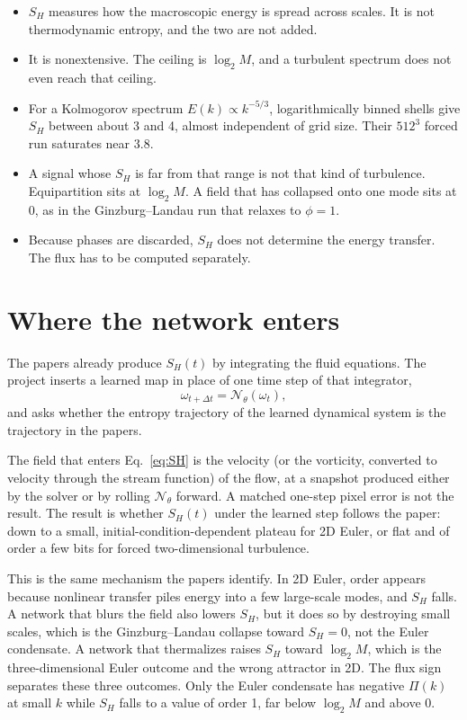 \documentclass[11pt,a4paper]{article}
\begin{document}
\begin{itemize}
  \item \(S_H\) measures how the macroscopic energy is spread across scales. It is not thermodynamic entropy, and the two are not added.
  \item It is nonextensive. The ceiling is \(\log_2 M\), and a turbulent spectrum does not even reach that ceiling.
  \item For a Kolmogorov spectrum \(E(k)\propto k^{-5/3}\), logarithmically binned shells give \(S_H\) between about 3 and 4, almost independent of grid size. Their \(512^3\) forced run saturates near \(3.8\).
  \item A signal whose \(S_H\) is far from that range is not that kind of turbulence. Equipartition sits at \(\log_2 M\). A field that has collapsed onto one mode sits at \(0\), as in the Ginzburg--Landau run that relaxes to \(\phi = 1\).
  \item Because phases are discarded, \(S_H\) does not determine the energy transfer. The flux has to be computed separately.
\end{itemize}

\section{Where the network enters}

The papers already produce \(S_H(t)\) by integrating the fluid equations.
The project inserts a learned map in place of one time step of that integrator,
\[
  \omega_{t+\Delta t} = \mathcal{N}_\theta(\omega_t),
\]
and asks whether the entropy trajectory of the learned dynamical system is the trajectory in the papers.

The field that enters Eq.~\eqref{eq:SH} is the velocity (or the vorticity, converted to velocity through the stream function) of the flow, at a snapshot produced either by the solver or by rolling \(\mathcal{N}_\theta\) forward.
A matched one-step pixel error is not the result.
The result is whether \(S_H(t)\) under the learned step follows the paper: down to a small, initial-condition-dependent plateau for 2D Euler, or flat and of order a few bits for forced two-dimensional turbulence.

This is the same mechanism the papers identify.
In 2D Euler, order appears because nonlinear transfer piles energy into a few large-scale modes, and \(S_H\) falls.
A network that blurs the field also lowers \(S_H\), but it does so by destroying small scales, which is the Ginzburg--Landau collapse toward \(S_H = 0\), not the Euler condensate.
A network that thermalizes raises \(S_H\) toward \(\log_2 M\), which is the three-dimensional Euler outcome and the wrong attractor in 2D.
The flux sign separates these three outcomes. Only the Euler condensate has negative \(\Pi(k)\) at small \(k\) while \(S_H\) falls to a value of order 1, far below \(\log_2 M\) and above 0.
\end{document}
